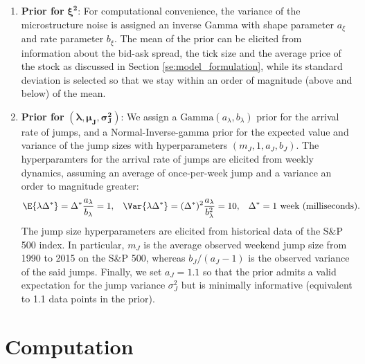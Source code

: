 \begin{enumerate}

\item{\textbf{Prior for} $\boldsymbol{\xi^2}$:}  For computational convenience, the variance of the microstructure noise is assigned an inverse Gamma with shape parameter $a_{\xi}$ and rate parameter $b_{\xi}$.  The mean of the prior can be elicited from information about the bid-ask spread, the tick size and the average price of the stock as discussed in Section \ref{se:model_formulation}, while its standard deviation is selected so that we stay within an order of magnitude (above and below) of the mean.


\item{\textbf{Prior for} $(\boldsymbol{\lambda}, \boldsymbol{\mu_J}, \boldsymbol{\sigma^2_J})$:} We assign a $\mbox{Gamma}(a_\lambda,b_\lambda)$ prior for the arrival rate of jumps, and a Normal-Inverse-gamma prior for the expected value and variance of the jump sizes with hyperparameters $(m_J, 1, a_J, b_J)$. The hyperparamters for the arrival rate of jumps are elicited from weekly dynamics, assuming an average of once-per-week jump and a variance an order to magnitude greater:
  \begin{align}
    \E{\lambda \Delta^*} &= \Delta^* \frac{a_\lambda}{b_\lambda} = 1, & \Var{\lambda \Delta^*} &= (\Delta^*)^2 \frac{a_\lambda}{b_\lambda^2} = 10, & \Delta^* &= 1 \mbox{ week (milliseconds).}
  \end{align}
  The jump size hyperparameters are elicited from historical data of the S\&P 500 index. In particular, $m_J$ is the average observed weekend jump size from 1990 to 2015 on the S\&P 500, whereas $b_J/(a_J-1)$ is the observed  variance of the said jumps. Finally, we set $a_J = 1.1$ so that the prior admits a valid expectation for the jump variance $\sigma_J^2$ but is minimally informative (equivalent to 1.1 data points in the prior).

\end{enumerate}


\section{Computation}\label{se:computation}

